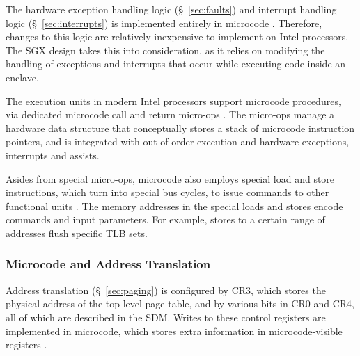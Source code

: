 The hardware exception handling logic (\S~\ref{sec:faults}) and interrupt
handling logic (\S~\ref{sec:interrupts}) is implemented entirely in microcode
\cite{intel1999exceptions}. Therefore, changes to this logic are relatively
inexpensive to implement on Intel processors. The SGX design takes this into
consideration, as it relies on modifying the handling of exceptions and
interrupts that occur while executing code inside an enclave.


The execution units in modern Intel processors support microcode procedures,
via dedicated microcode call and return micro-ops \cite{intel2007microstack}.
The micro-ops manage a hardware data structure that conceptually stores a stack
of microcode instruction pointers, and is integrated with out-of-order
execution and hardware exceptions, interrupts and assists.


Asides from special micro-ops, microcode also employs special load and store
instructions, which turn into special bus cycles, to issue commands to other
functional units \cite{intel1997microspace}. The memory addresses in the
special loads and stores encode commands and input parameters. For example,
stores to a certain range of addresses flush specific TLB sets.


\subsubsection{Microcode and Address Translation}
\label{sec:microcode_pmh}


Address translation (\S~\ref{sec:paging}) is configured by CR3, which stores
the physical address of the top-level page table, and by various bits in CR0
and CR4, all of which are described in the SDM. Writes to these control
registers are implemented in microcode, which stores extra information in
microcode-visible registers \cite{intel2009pipeline}.


